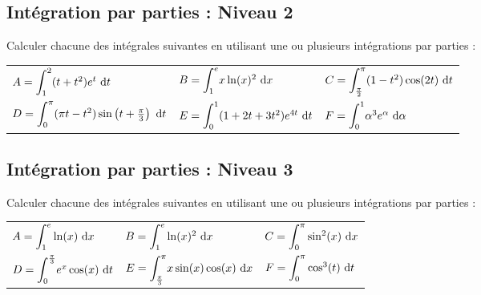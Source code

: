 \documentclass[oneside,12pt]{book}          %
\begin{document}
\subsection{Intégration par parties : Niveau 2}
Calculer chacune des intégrales suivantes en utilisant une ou plusieurs intégrations par parties :

\begin{tabular}{p{} p{} p{}}
	$A={\displaystyle\int_{1}^{2}}(t+t^2)e^t{\,\,\mathrm{d}} t$ & $B={\displaystyle\int_{1}^{e}}x\ln(x)^2{\,\,\mathrm{d}} x$ & $C={\displaystyle\int_{\frac{\pi}{2}}^{\pi}}(1-t^2)\cos(2t){\,\,\mathrm{d}} t$ \\[5pt]
	$D={\displaystyle\int_{0}^{\pi}}(\pi t-t^2)\sin\left(t+\frac{\pi}{3}\right){\,\,\mathrm{d}} t$ & $E={\displaystyle\int_{0}^{1}}(1+2t+3t^2)e^{4t}{\,\,\mathrm{d}} t$ & $F={\displaystyle\int_{0}^{1}}\alpha^3e^\alpha{\,\,\mathrm{d}} \alpha$
\end{tabular}



\subsection{Intégration par parties : Niveau 3}
Calculer chacune des intégrales suivantes en utilisant une ou plusieurs intégrations par parties :

\begin{tabular}{p{} p{} p{}}
	$A={\displaystyle\int_{1}^{e}}\ln(x){\,\,\mathrm{d}} x$ & $B={\displaystyle\int_{1}^{e}}\ln(x)^2{\,\,\mathrm{d}} x$ & $C={\displaystyle\int_{0}^{\pi}}\sin^2(x){\,\,\mathrm{d}} x$ \\[5pt]
	$D={\displaystyle\int_{0}^{\frac{\pi}{3}}}e^x\cos(x){\,\,\mathrm{d}} t$ & $E={\displaystyle\int_{\frac{\pi}{3}}^{\pi}}x\sin(x)\cos(x){\,\,\mathrm{d}} x$ & $F={\displaystyle\int_{0}^{\pi}}\cos^3(t){\,\,\mathrm{d}} t$
\end{tabular}
\end{document}
